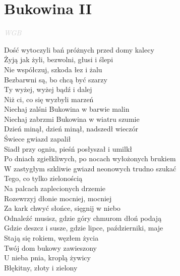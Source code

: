 \documentclass[a5paper, 10pt]{book}
\begin{document}
\section{Bukowina II}\textcolor{lightgray}{\textit{WGB}}\vspace*{1.5mm}\\
\begin{minipage}[t]{0.7\textwidth}
  Dość wytoczyli bań próżnych przed domy kalecy		\\
  Żyją jak żyli, bezwolni, głusi i ślepi				\\
  Nie współczuj, szkoda łez i żalu				\\
  Bezbarwni są, bo chcą być szarzy				\\
  Ty wyżej, wyżej bądź i dalej\\
  Niż ci, co się wyzbyli marzeń \vspace*{1.5mm}
  \\
  \hspace*{5mm}Niechaj zalśni Bukowina w barwie malin			\\
  \hspace*{5mm}Niechaj zabrzmi Bukowina w wiatru szumie		\\
  \hspace*{5mm}Dzień minął, dzień minął, nadszedł wieczór		\\
  \hspace*{5mm}Świece gwiazd zapalił						\\
  \hspace*{5mm}Siadł przy ogniu, pieśń posłyszał i umilkł\vspace*{1.5mm}
  \\
  Po dniach zgiełkliwych, po nocach wyłożonych brukiem\\
  W zastygłym szkliwie gwiazd neonowych trudno szukać\\
  Tego, co tylko zielonością					\\
  Na palcach zaplecionych drzemie 				\\
  Rozewrzyj dłonie mocniej, mocniej				\\
  Za kark chwyć słońce, sięgnij w niebo\vspace*{1.5mm}
  \\
  Odnaleźć musisz, gdzie góry chmurom dłoń podają\\
  Gdzie deszcz i susze, gdzie lipce, październiki, maje\\
  Stają się rokiem, węzłem życia				\\
  Twój dom bukowy zawieszony 				\\
  U nieba pnia, kroplą żywicy				\\
  Błękitny, złoty i zielony					\\
\end{minipage}
\end{document}
